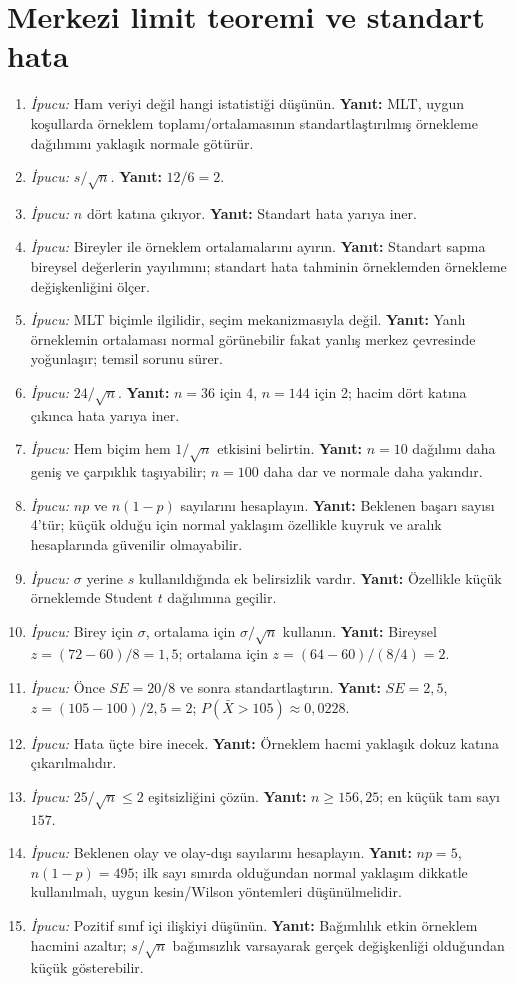 \section{Merkezi limit teoremi ve standart hata}

\begin{enumerate}[leftmargin=*,itemsep=5pt]
\item \emph{İpucu:} Ham veriyi değil hangi istatistiği düşünün.
\textbf{Yanıt:} MLT, uygun koşullarda örneklem toplamı/ortalamasının
standartlaştırılmış örnekleme dağılımını yaklaşık normale götürür.
\item \emph{İpucu:} $s/\sqrt n$. \textbf{Yanıt:} $12/6=2$.
\item \emph{İpucu:} $n$ dört katına çıkıyor.
\textbf{Yanıt:} Standart hata yarıya iner.
\item \emph{İpucu:} Bireyler ile örneklem ortalamalarını ayırın.
\textbf{Yanıt:} Standart sapma bireysel değerlerin yayılımını; standart hata
tahminin örneklemden örnekleme değişkenliğini ölçer.
\item \emph{İpucu:} MLT biçimle ilgilidir, seçim mekanizmasıyla değil.
\textbf{Yanıt:} Yanlı örneklemin ortalaması normal görünebilir fakat yanlış
merkez çevresinde yoğunlaşır; temsil sorunu sürer.
\item \emph{İpucu:} $24/\sqrt n$. \textbf{Yanıt:} $n=36$ için 4,
$n=144$ için 2; hacim dört katına çıkınca hata yarıya iner.
\item \emph{İpucu:} Hem biçim hem $1/\sqrt n$ etkisini belirtin.
\textbf{Yanıt:} $n=10$ dağılımı daha geniş ve çarpıklık taşıyabilir;
$n=100$ daha dar ve normale daha yakındır.
\item \emph{İpucu:} $np$ ve $n(1-p)$ sayılarını hesaplayın.
\textbf{Yanıt:} Beklenen başarı sayısı 4'tür; küçük olduğu için normal yaklaşım
özellikle kuyruk ve aralık hesaplarında güvenilir olmayabilir.
\item \emph{İpucu:} $\sigma$ yerine $s$ kullanıldığında ek belirsizlik vardır.
\textbf{Yanıt:} Özellikle küçük örneklemde Student $t$ dağılımına geçilir.
\item \emph{İpucu:} Birey için $\sigma$, ortalama için $\sigma/\sqrt n$ kullanın.
\textbf{Yanıt:} Bireysel $z=(72-60)/8=1{,}5$; ortalama için
$z=(64-60)/(8/4)=2$.
\item \emph{İpucu:} Önce $SE=20/8$ ve sonra standartlaştırın.
\textbf{Yanıt:} $SE=2{,}5$, $z=(105-100)/2{,}5=2$;
$P(\bar X>105)\approx0{,}0228$.
\item \emph{İpucu:} Hata üçte bire inecek.
\textbf{Yanıt:} Örneklem hacmi yaklaşık dokuz katına çıkarılmalıdır.
\item \emph{İpucu:} $25/\sqrt n\le2$ eşitsizliğini çözün.
\textbf{Yanıt:} $n\ge156{,}25$; en küçük tam sayı $157$.
\item \emph{İpucu:} Beklenen olay ve olay-dışı sayılarını hesaplayın.
\textbf{Yanıt:} $np=5$, $n(1-p)=495$; ilk sayı sınırda olduğundan normal
yaklaşım dikkatle kullanılmalı, uygun kesin/Wilson yöntemleri düşünülmelidir.
\item \emph{İpucu:} Pozitif sınıf içi ilişkiyi düşünün.
\textbf{Yanıt:} Bağımlılık etkin örneklem hacmini azaltır; $s/\sqrt n$
bağımsızlık varsayarak gerçek değişkenliği olduğundan küçük gösterebilir.
\end{enumerate}

